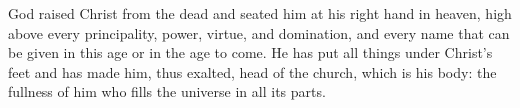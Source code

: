 \lettrine[lines=3]{G}{}od raised Christ from the dead and seated him at his right hand in heaven, high above every principality, power, virtue, and domination, and every name that can be given in this age or in the age to come. He has put all things under Christ’s feet and has made him, thus exalted, head of the church, which is his body: the fullness of him who fills the universe in all its parts.
